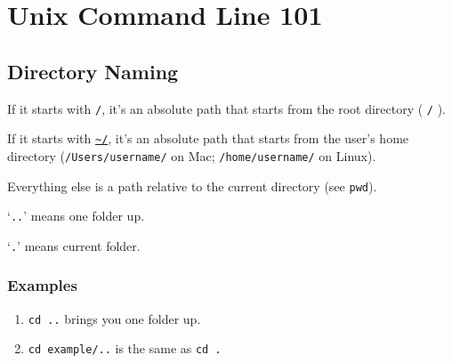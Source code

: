 \documentclass[12pt]{article}
\newcommand{\urlwofont}[1]{\urlstyle{same}\url{#1}}
\begin{document}
\newpage
\section{Unix Command Line 101}
\subsection{Directory Naming}

If it starts with \texttt{/}, it's an absolute path that starts from the root directory ( \texttt{/} ).

If it starts with \texttt{\urlwofont{~/}}, it's an absolute path that starts from the user's home directory (\texttt{/Users/username/} on Mac; \texttt{/home/username/} on Linux).

Everything else is a path relative to the current directory (see \texttt{pwd}).

`\texttt{..}' means one folder up.

`\texttt{.}' means current folder.

\subsubsection{Examples}
\begin{enumerate}
\item \texttt{cd ..} brings you one folder up.
\item \texttt{cd example/..} is the same as \texttt{cd .}
\end{enumerate}
\end{document}
